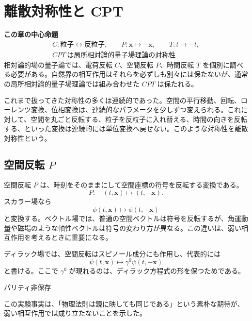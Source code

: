 \section{離散対称性と CPT}

\noindent\textbf{この章の中心命題}
\[
\boxed{
\begin{gathered}
C:\text{粒子}\leftrightarrow\text{反粒子},
\qquad
P:\mathbf{x}\mapsto-\mathbf{x},
\qquad
T:t\mapsto -t,\\
CPT\ \text{は局所相対論的量子場理論の対称性}
\end{gathered}
}
\]
相対論的場の量子論では、電荷反転 $C$、空間反転 $P$、時間反転 $T$ を個別に調べる必要がある。自然界の相互作用はそれらを必ずしも別々には保たないが、通常の局所相対論的量子場理論では組み合わせた $CPT$ は保たれる。

これまで扱ってきた対称性の多くは連続的であった。空間の平行移動、回転、ローレンツ変換、位相変換は、連続的なパラメータを少しずつ変えられる。これに対して、空間を丸ごと反転する、粒子を反粒子に入れ替える、時間の向きを反転する、といった変換は連続的には単位変換へ戻せない。このような対称性を離散対称性という。

\subsection{空間反転 $P$}
空間反転 $P$ は、時刻をそのままにして空間座標の符号を反転する変換である。
\[
P:\quad (t,\mathbf{x})\mapsto(t,-\mathbf{x}).
\]
スカラー場なら
\[
\phi(t,\mathbf{x})\mapsto \phi(t,-\mathbf{x})
\]
と変換する。ベクトル場では、普通の空間ベクトルは符号を反転するが、角運動量や磁場のような軸性ベクトルは符号の変わり方が異なる。この違いは、弱い相互作用を考えるときに重要になる。

ディラック場では、空間反転はスピノール成分にも作用し、代表的には
\[
\psi(t,\mathbf{x})
\mapsto
\gamma^0\psi(t,-\mathbf{x})
\]
と書ける。ここで $\gamma^0$ が現れるのは、ディラック方程式の形を保つためである。

\begin{experimentalfact}{パリティ非保存}
\end{experimentalfact}

この実験事実は、「物理法則は鏡に映しても同じである」という素朴な期待が、弱い相互作用では成り立たないことを示した。

